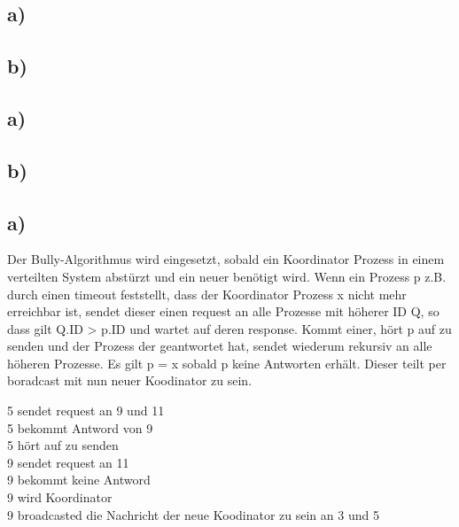 \documentclass[ngerman]{fbi-aufgabenblatt}
\begin{document}
	\setcounter{section}{0}

	
	\subsection*{a)}

	\subsection*{b)}

    
	
	\subsection*{a)}

	\subsection*{b)}	
	
	\subsection*{a)}
	Der Bully-Algorithmus wird eingesetzt, sobald ein Koordinator Prozess in einem verteilten System abstürzt und ein neuer benötigt wird.
	Wenn ein Prozess p z.B. durch einen timeout feststellt, dass der Koordinator Prozess x nicht mehr erreichbar ist, sendet dieser einen request an alle Prozesse mit höherer ID Q, so dass gilt Q.ID > p.ID und wartet auf deren response. Kommt einer, hört p auf zu senden und der Prozess der geantwortet hat, sendet wiederum rekursiv an alle höheren Prozesse. Es gilt p = x sobald p keine Antworten erhält. Dieser teilt per boradcast mit nun neuer Koodinator zu sein.

	5 sendet request an 9 und 11\\
	5 bekommt Antword von 9\\
	5 hört auf zu senden\\
	9 sendet request an 11\\
	9 bekommt keine Antword\\
	9 wird Koordinator\\
	9 broadcasted die Nachricht der neue Koodinator zu sein an 3 und 5 	
		
	
\end{document}
